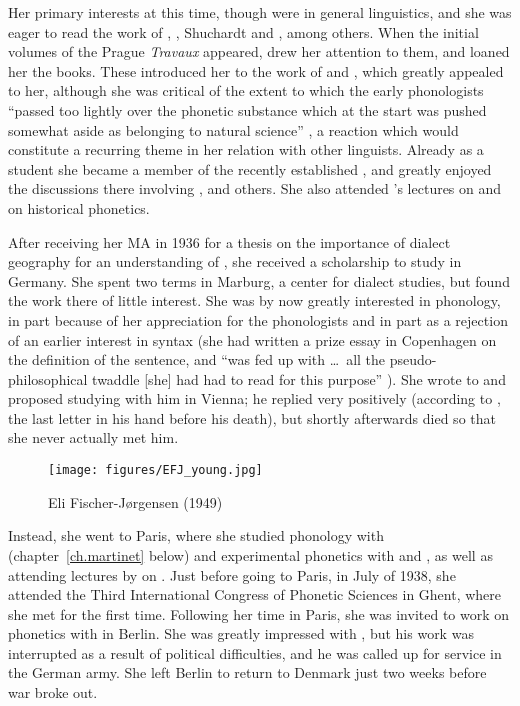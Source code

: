 Her primary interests at this time, though were in general
linguistics, and she was eager to read the work of {\Saussure}, {\Meillet},
Shuchardt and {\Jespersen}, among others. When the initial volumes of the
Prague \textsl{Travaux} appeared, {\Hammerich} drew her attention to
them, and loaned her the books. These introduced her to the work of
{\Trubetzkoy} and {\Jakobson}, which greatly appealed to her, although she
was critical of the extent to which the early phonologists ``passed
too lightly over the phonetic substance which at the start was pushed
somewhat aside as belonging to natural science''
\citep[62f.]{fischer-jorgensen81:causerie}, a reaction which would
constitute a recurring theme in her relation with other
linguists. Already as a student she became a member of the recently
established , and greatly enjoyed the
discussions there involving {}, {\Hjelmslev} and others. She also
attended {\Hjelmslev}'s lectures on  and on
 historical phonetics.

After receiving her MA in 1936 for a thesis on the importance of
dialect geography for an understanding of , she received a
scholarship to study in Germany. She spent two terms in Marburg, a
center for dialect studies, but found the work there of little
interest. She was by now greatly interested in phonology, in part
because of her appreciation for the  phonologists and in
part as a rejection of an earlier interest in syntax (she had written
a prize essay in Copenhagen on the definition of the sentence, and
``was fed up with \ldots\ all the pseudo-philosophical twaddle {[she]}
had had to read for this purpose''
\citealt[63]{fischer-jorgensen81:causerie}). She wrote to {\Trubetzkoy} and
proposed studying with him in Vienna; he replied very positively
(according to {\Jakobson}, the last letter in his hand before his death), but
shortly afterwards died so that she never actually met him.

\begin{wrapfigure}{r}{.3\textwidth}
  \texttt{[image: figures/EFJ\_young.jpg]}
  \caption{Eli Fischer-Jørgensen (1949)}
  \label{fig:ch.hjelmslev.efj-young}
\end{wrapfigure}
Instead, she went to Paris, where she studied phonology with  (chapter~\ref{ch.martinet} below) and experimental phonetics
with  and , as well as attending lectures
by  on . Just before going to Paris, in
July of 1938, she attended the Third International Congress of
Phonetic Sciences in Ghent, where she met {\Jakobson} for the first
time. Following her time in Paris, she was invited to work on
phonetics with  in Berlin. She was greatly impressed
with {\Zwirner}, but his work was interrupted as a result of political
difficulties, and he was called up for service in the {German} army. She
left Berlin to return to Denmark just two weeks before war broke out.

